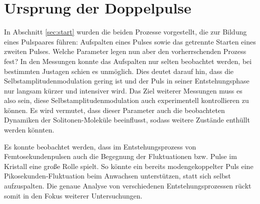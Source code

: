 \documentclass[bachelor,       %
               twoside,        %
               BCOR10mm,       %
               liststotoc,nomtotoc,bibtotoc, %
               english,ngerman, %
               final,          %
               ]{GAUBM}
\begin{document}
\section{Ursprung der Doppelpulse}
In Abschnitt \ref{sec:start} wurden die beiden Prozesse vorgestellt, die zur Bildung eines Pulspaares führen:
Aufspalten eines Pulses sowie das getrennte Starten eines zweiten Pulses.
Welche Parameter legen nun aber den vorherrschenden Prozess fest?
In den Messungen konnte das Aufspalten nur selten beobachtet werden, bei bestimmten Justagen schien es unmöglich.
Dies deutet darauf hin, dass die Selbstamplitudenmodulation gering ist und der Puls in seiner Entstehungsphase nur langsam kürzer und intensiver wird.
Das Ziel weiterer Messungen muss es also sein, diese Selbstamplitudenmodulation auch experimentell kontrollieren zu können.
Es wird vermutet, dass dieser Parameter auch die beobachteten Dynamiken der Solitonen-Moleküle beeinflusst, sodass weitere Zustände enthüllt werden könnten.

Es konnte beobachtet werden, dass im Entstehungsprozess von Femtosekundenpulsen auch die Begegnung der Fluktuationen bzw. Pulse im Kristall eine große Rolle spielt.
So könnte ein bereits modengekoppelter Puls eine Pikosekunden-Fluktuation beim Anwachsen unterstützen, statt sich selbst aufzuspalten.
Die genaue Analyse von verschiedenen Entstehungsprozessen rückt somit in den Fokus weiterer Untersuchungen.

\appendix
\end{document}
